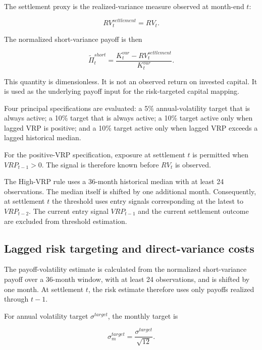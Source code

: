 The settlement proxy is the realized-variance measure observed at month-end $t$:

\begin{equation}
RV_t^{settlement}
=
RV_t.
\end{equation}

The normalized short-variance payoff is then

\begin{equation}
\widetilde{\Pi}_t^{short}
=
\frac{
K_t^{var}
-
RV_t^{settlement}
}{
K_t^{var}
}.
\end{equation}

This quantity is dimensionless. It is not an observed return on invested capital. It is used as the underlying payoff input for the risk-targeted capital mapping.

Four principal specifications are evaluated: a 5\% annual-volatility target that is always active; a 10\% target that is always active; a 10\% target active only when lagged VRP is positive; and a 10\% target active only when lagged VRP exceeds a lagged historical median.

For the positive-VRP specification, exposure at settlement $t$ is permitted when $VRP_{t-1}>0$. The signal is therefore known before $RV_t$ is observed.

The High-VRP rule uses a 36-month historical median with at least 24 observations. The median itself is shifted by one additional month. Consequently, at settlement $t$ the threshold uses entry signals corresponding at the latest to $VRP_{t-2}$. The current entry signal $VRP_{t-1}$ and the current settlement outcome are excluded from threshold estimation.

\subsection{Lagged risk targeting and direct-variance costs}

The payoff-volatility estimate is calculated from the normalized short-variance payoff over a 36-month window, with at least 24 observations, and is shifted by one month. At settlement $t$, the risk estimate therefore uses only payoffs realized through $t-1$.

For annual volatility target $\sigma^{target}$, the monthly target is

\begin{equation}
\sigma^{target}_{m}
=
\frac{
\sigma^{target}
}{
\sqrt{12}
}.
\end{equation}

